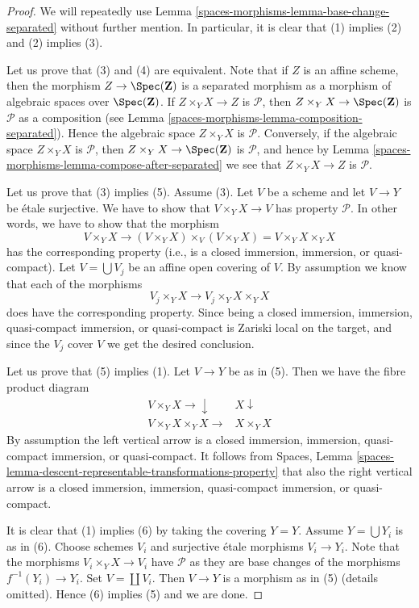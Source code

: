 \begin{proof}
We will repeatedly use
Lemma \ref{spaces-morphisms-lemma-base-change-separated}
without further mention. In particular, it is clear that
(1) implies (2) and (2) implies (3).

\medskip\noindent
Let us prove that (3) and (4) are equivalent. Note that if $Z$ is an affine
scheme, then the morphism $Z \to \Spec(\mathbf{Z})$ is a separated
morphism as a morphism of algebraic spaces over $\Spec(\mathbf{Z})$.
If $Z \times_Y X \to Z$ is $\mathcal{P}$, then
$Z \times_Y X \to \Spec(\mathbf{Z})$ is $\mathcal{P}$
as a composition (see
Lemma \ref{spaces-morphisms-lemma-composition-separated}). Hence the algebraic
space $Z \times_Y X$ is $\mathcal{P}$. Conversely, if the algebraic
space $Z \times_Y X$ is $\mathcal{P}$, then
$Z \times_Y X \to \Spec(\mathbf{Z})$ is $\mathcal{P}$, and
hence by
Lemma \ref{spaces-morphisms-lemma-compose-after-separated}
we see that $Z \times_Y X \to Z$ is $\mathcal{P}$.

\medskip\noindent
Let us prove that (3) implies (5). Assume (3). Let $V$ be a scheme
and let $V \to Y$ be \'etale surjective. We have to show that
$V \times_Y X \to V$ has property $\mathcal{P}$. In other words,
we have to show that the morphism
$$
V \times_Y X \longrightarrow
(V \times_Y X) \times_V (V \times_Y X) = V \times_Y X \times_Y X
$$
has the corresponding property (i.e., is a closed immersion, immersion,
or quasi-compact). Let $V = \bigcup V_j$ be an
affine open covering of $V$. By assumption we know that each of the morphisms
$$
V_j \times_Y X \longrightarrow V_j \times_Y X \times_Y X
$$
does have the corresponding property. Since being a closed immersion,
immersion, quasi-compact immersion, or quasi-compact is Zariski local
on the target, and since the $V_j$ cover $V$ we get the desired conclusion.

\medskip\noindent
Let us prove that (5) implies (1). Let $V \to Y$ be as in (5).
Then we have the fibre product diagram
$$
\begin{array}{cc}V \times_Y X \longrightarrow\downarrow & X \downarrow \\ V \times_Y X \times_Y X \longrightarrow & X \times_Y X\end{array}
$$
By assumption the left vertical arrow is a closed immersion,
immersion, quasi-compact immersion, or quasi-compact. It follows from
Spaces, Lemma \ref{spaces-lemma-descent-representable-transformations-property}
that also the right vertical arrow is a closed immersion,
immersion, quasi-compact immersion, or quasi-compact.

\medskip\noindent
It is clear that (1) implies (6) by taking the covering $Y = Y$.
Assume $Y = \bigcup Y_i$ is as in (6). Choose schemes $V_i$ and
surjective \'etale morphisms $V_i \to Y_i$. Note that the morphisms
$V_i \times_Y X \to V_i$ have $\mathcal{P}$ as they are base changes
of the morphisms $f^{-1}(Y_i) \to Y_i$. Set $V = \coprod V_i$.
Then $V \to Y$ is a morphism as in (5) (details omitted). Hence
(6) implies (5) and we are done.
\end{proof}

